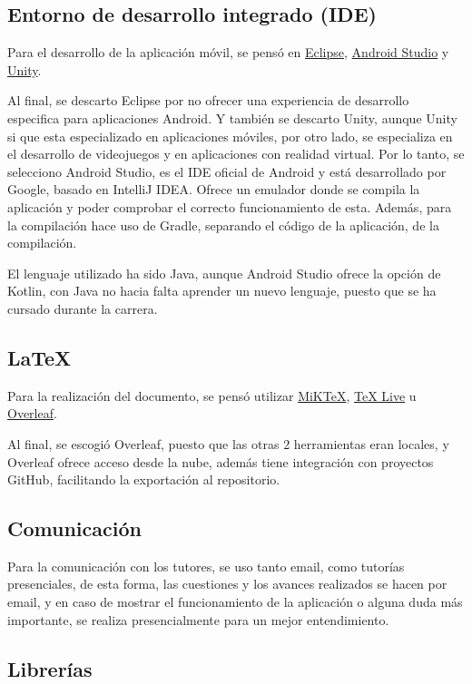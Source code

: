     \subsection{Entorno de desarrollo integrado (IDE)}
        Para el desarrollo de la aplicación móvil, se pensó en \href{https://www.eclipse.org/downloads/}{Eclipse}, \href{https://developer.android.com/studio}{Android Studio} y \href{https://unity.com/es}{Unity}.

        Al final, se descarto Eclipse por no ofrecer una experiencia de desarrollo especifica para aplicaciones Android. Y también se descarto Unity, aunque Unity si que esta especializado en aplicaciones móviles, por otro lado, se especializa en el desarrollo de videojuegos y en aplicaciones con realidad virtual.
        Por lo tanto, se selecciono Android Studio, es el IDE oficial de Android y está desarrollado por Google, basado en IntelliJ IDEA. Ofrece un emulador donde se compila la aplicación y poder comprobar el correcto funcionamiento de esta.
        Además, para la compilación hace uso de Gradle, separando el código de la aplicación, de la compilación.

        El lenguaje utilizado ha sido Java, aunque Android Studio ofrece la opción de Kotlin, con Java no hacia falta aprender un nuevo lenguaje, puesto que se ha cursado durante la carrera.

    \subsection{LaTeX}
        Para la realización del documento, se pensó utilizar \href{https://miktex.org/}{MiKTeX}, \href{https://www.tug.org/texlive/}{TeX Live} u \href{https://www.overleaf.com/}{Overleaf}.
    
        Al final, se escogió Overleaf, puesto que las otras 2 herramientas eran locales, y Overleaf ofrece acceso desde la nube, además tiene integración con proyectos GitHub, facilitando la exportación al repositorio.
    \subsection{Comunicación}
        Para la comunicación con los tutores, se uso tanto email, como tutorías presenciales, de esta forma, las cuestiones y los avances realizados se hacen por email, y en caso de mostrar el funcionamiento de la aplicación o alguna duda más importante, se realiza presencialmente para un mejor entendimiento.

    \subsection{Librerías}
    
